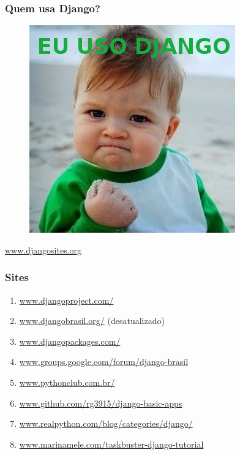\documentclass[aspectratio=169]{beamer}
\begin{document}
\begin{frame}\frametitle{Quem usa Django?}

	\begin{figure}[h]
	  \centering
  		\includegraphics[height=.7\paperheight]{img/eu_uso_django}
	\end{figure}

\begin{center}
\url{www.djangosites.org}
\end{center}


\end{frame}


\begin{frame}\frametitle{Sites}

\begin{enumerate}
	\item \url{www.djangoproject.com/}

	\item \url{www.djangobrasil.org/} (desatualizado)

	\item \url{www.djangopackages.com/}

	\item \url{www.groups.google.com/forum/django-brasil}

	\item \url{www.pythonclub.com.br/}

	\item \url{www.github.com/rg3915/django-basic-apps}

	\item \url{www.realpython.com/blog/categories/django/}

	\item \url{www.marinamele.com/taskbuster-django-tutorial}
\end{enumerate}

\end{frame}
\end{document}

